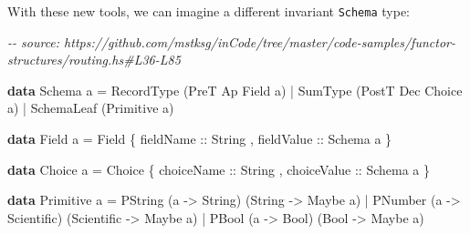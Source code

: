 \documentclass[]{article}
\newenvironment{Shaded}{}{}
\newcommand{\CommentTok}[1]{\textcolor[rgb]{0.38,0.63,0.69}{\textit{#1}}}
\newcommand{\DataTypeTok}[1]{\textcolor[rgb]{0.56,0.13,0.00}{#1}}
\newcommand{\KeywordTok}[1]{\textcolor[rgb]{0.00,0.44,0.13}{\textbf{#1}}}
\newcommand{\NormalTok}[1]{#1}
\newcommand{\OperatorTok}[1]{\textcolor[rgb]{0.40,0.40,0.40}{#1}}
\newcommand{\OtherTok}[1]{\textcolor[rgb]{0.00,0.44,0.13}{#1}}
\begin{document}
With these new tools, we can imagine a different invariant \texttt{Schema} type:

\begin{Shaded}
\begin{Highlighting}[]
\CommentTok{{-}{-} source: https://github.com/mstksg/inCode/tree/master/code{-}samples/functor{-}structures/routing.hs\#L36{-}L85}

\KeywordTok{data} \DataTypeTok{Schema}\NormalTok{ a }\OtherTok{=}
      \DataTypeTok{RecordType}\NormalTok{  (}\DataTypeTok{PreT}  \DataTypeTok{Ap}  \DataTypeTok{Field}\NormalTok{  a)}
    \OperatorTok{|} \DataTypeTok{SumType}\NormalTok{     (}\DataTypeTok{PostT} \DataTypeTok{Dec} \DataTypeTok{Choice}\NormalTok{ a)}
    \OperatorTok{|} \DataTypeTok{SchemaLeaf}\NormalTok{  (}\DataTypeTok{Primitive}\NormalTok{ a)}

\KeywordTok{data} \DataTypeTok{Field}\NormalTok{ a }\OtherTok{=} \DataTypeTok{Field}
\NormalTok{    \{}\OtherTok{ fieldName  ::} \DataTypeTok{String}
\NormalTok{    ,}\OtherTok{ fieldValue ::} \DataTypeTok{Schema}\NormalTok{ a}
\NormalTok{    \}}

\KeywordTok{data} \DataTypeTok{Choice}\NormalTok{ a }\OtherTok{=} \DataTypeTok{Choice}
\NormalTok{    \{}\OtherTok{ choiceName  ::} \DataTypeTok{String}
\NormalTok{    ,}\OtherTok{ choiceValue ::} \DataTypeTok{Schema}\NormalTok{ a}
\NormalTok{    \}}

\KeywordTok{data} \DataTypeTok{Primitive}\NormalTok{ a }\OtherTok{=}
      \DataTypeTok{PString}\NormalTok{ (a }\OtherTok{{-}>} \DataTypeTok{String}\NormalTok{)     (}\DataTypeTok{String}     \OtherTok{{-}>} \DataTypeTok{Maybe}\NormalTok{ a)}
    \OperatorTok{|} \DataTypeTok{PNumber}\NormalTok{ (a }\OtherTok{{-}>} \DataTypeTok{Scientific}\NormalTok{) (}\DataTypeTok{Scientific} \OtherTok{{-}>} \DataTypeTok{Maybe}\NormalTok{ a)}
    \OperatorTok{|} \DataTypeTok{PBool}\NormalTok{   (a }\OtherTok{{-}>} \DataTypeTok{Bool}\NormalTok{)       (}\DataTypeTok{Bool}       \OtherTok{{-}>} \DataTypeTok{Maybe}\NormalTok{ a)}


\end{Highlighting}
\end{Shaded}
\end{document}

